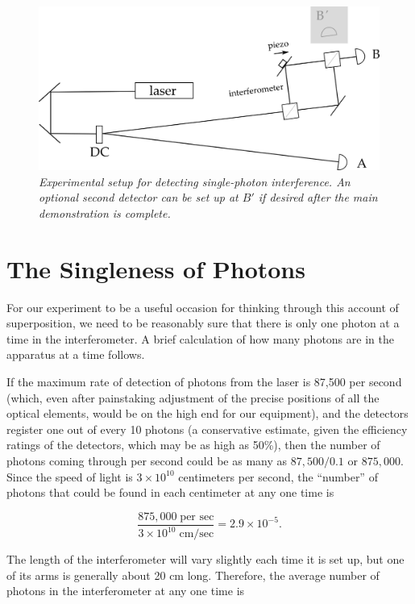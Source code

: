 \begin{figure}[h]
  \begin{center}
    \includegraphics[width=4.40667in,height=2.11667in]{images/14_interference/interference-apparatus.png}
    \captionsetup{width=.75\textwidth}
    \caption*{\emph{Experimental setup for detecting single-photon interference. An optional second detector
    can be set up at $B'$ if desired after the main demonstration is complete.}}
  \end{center}
\end{figure}

\section*{The Singleness of Photons}

For our experiment to be a useful occasion for thinking through this account of superposition, we need to be reasonably sure that there is only one photon at a time in the interferometer.  A brief calculation of how many photons are in the apparatus at a time follows.

If the maximum rate of detection of photons from the laser is 87,500 per second (which, even after painstaking adjustment of the precise positions of all the optical elements, would be on the high end for our equipment), and the detectors register one out of every 10 photons (a conservative estimate, given the efficiency ratings of the detectors, which may be as high as 50\%), then the number of photons coming through per second could be as many as $87,500/0.1$ or $875,000$.  Since the speed of light is $3\times 10^{10}$ centimeters per second, the ``number'' of photons that could be found in each centimeter at any one time is

\[\frac{875,000 \; \text{per sec}}{3 \times 10^{10}\; \text{cm/sec}} = 2.9 \times 10^{-5}. \]

The length of the interferometer will vary slightly each time it is set up, but one of its arms is generally about 20 cm long.  Therefore, the average number of photons in the interferometer at any one time is 

